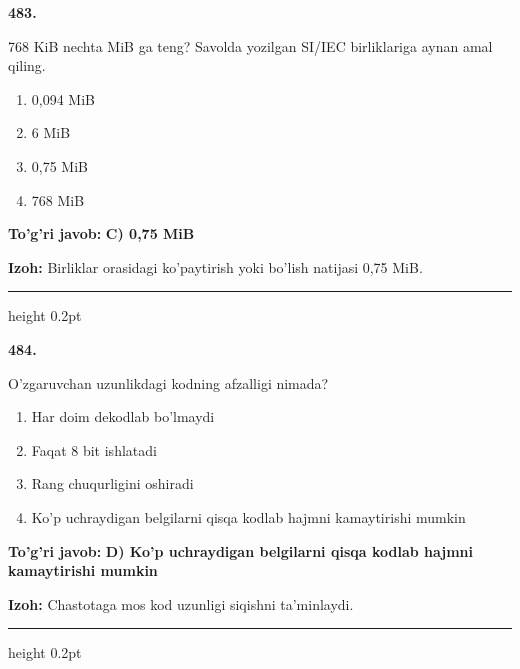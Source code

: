 \documentclass[10pt,a4paper,oneside]{article}
\begin{document}
\noindent\textbf{\color{ink}483.}
\par
768 KiB nechta MiB ga teng? Savolda yozilgan SI/IEC birliklariga aynan amal qiling.
\begin{enumerate}[label=\Alph*),leftmargin=9mm]
\item 0,094 MiB
\item 6 MiB
\item 0,75 MiB
\item 768 MiB
\end{enumerate}
\begin{tcolorbox}[enhanced,breakable,colback=teal!4,colframe=teal!50!black,boxrule=0.5pt,arc=1.1mm,left=3mm,right=3mm,top=1.7mm,bottom=1.7mm,before skip=2mm,after skip=2mm]
\textbf{\color{teal}To'g'ri javob:} \textbf{C) 0,75 MiB}
\par\smallskip
\textbf{Izoh:} Birliklar orasidagi ko'paytirish yoki bo'lish natijasi 0,75 MiB.
\end{tcolorbox}
\vspace{2mm}\hrule height 0.2pt \vspace{3mm}

\noindent\textbf{\color{ink}484.}
\par
O'zgaruvchan uzunlikdagi kodning afzalligi nimada?
\begin{enumerate}[label=\Alph*),leftmargin=9mm]
\item Har doim dekodlab bo'lmaydi
\item Faqat 8 bit ishlatadi
\item Rang chuqurligini oshiradi
\item Ko'p uchraydigan belgilarni qisqa kodlab hajmni kamaytirishi mumkin
\end{enumerate}
\begin{tcolorbox}[enhanced,breakable,colback=teal!4,colframe=teal!50!black,boxrule=0.5pt,arc=1.1mm,left=3mm,right=3mm,top=1.7mm,bottom=1.7mm,before skip=2mm,after skip=2mm]
\textbf{\color{teal}To'g'ri javob:} \textbf{D) Ko'p uchraydigan belgilarni qisqa kodlab hajmni kamaytirishi mumkin}
\par\smallskip
\textbf{Izoh:} Chastotaga mos kod uzunligi siqishni ta'minlaydi.
\end{tcolorbox}
\vspace{2mm}\hrule height 0.2pt \vspace{3mm}
\end{document}
